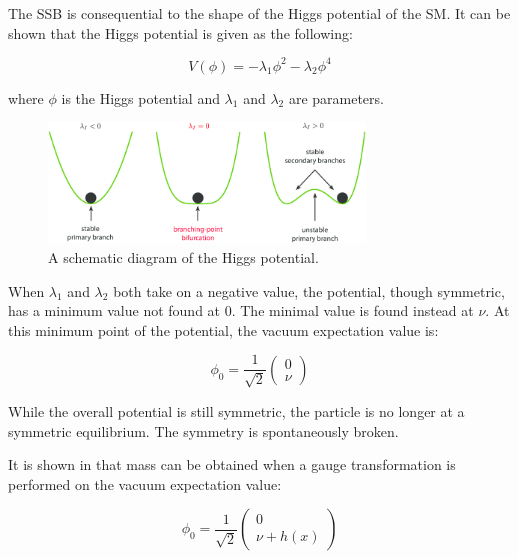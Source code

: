 The SSB is consequential to the shape of the Higgs potential of the SM. It can be shown that the Higgs potential is given as the following:

\begin{equation}
    V(\phi) = - \lambda_{1}\phi^{2} - \lambda_{2} \phi^{4}
    \label{eq:HiggsPotential}
\end{equation}

where $\phi$ is the Higgs potential and $\lambda_{1}$ and $\lambda_{2}$ are parameters. 

\begin{figure}[!htb]
    \begin{center}
        \includegraphics[width=0.75\textwidth]{figures/chapter_SM/SSB}
        \caption{
        A schematic diagram of the Higgs potential\cite{Potential}.}
        \label{fig:SM}
    \end{center}
\end{figure}

When $\lambda_{1}$ and $\lambda_2$ both take on a negative value, the potential, though symmetric, has a minimum value not found at 0. The minimal value is found instead at $\nu$. At this minimum point of the potential, the vacuum expectation value is:

\begin{equation}
    \phi_{0} = \frac{1}{\sqrt{2}}
    \begin{pmatrix}
        0\\
        \nu
    \end{pmatrix}
\end{equation}

While the overall potential is still symmetric, the particle is no longer at a symmetric equilibrium. The symmetry is spontaneously broken. 

It is shown in\cite{peskin2018introduction} that mass can be obtained when a gauge transformation is performed on the vacuum expectation value:

\begin{equation}
    \phi_{0} = \frac{1}{\sqrt{2}}
    \begin{pmatrix}
        0\\
        \nu+h(x)
    \end{pmatrix}
\end{equation}

